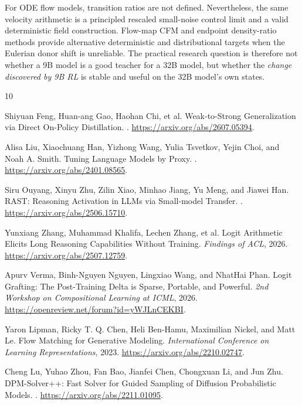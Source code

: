 \documentclass[11pt,a4paper]{article}
\theoremstyle{plain}
\theoremstyle{definition}
\begin{document}
For ODE flow models, transition ratios are not defined.  Nevertheless, the same velocity arithmetic
is a principled rescaled small-noise control limit and a valid deterministic field construction.
Flow-map CFM and endpoint density-ratio methods provide alternative deterministic and distributional
targets when the Eulerian donor shift is unreliable.  The practical research question is therefore
not whether a 9B model is a good teacher for a 32B model, but whether the \emph{change discovered by
9B RL} is stable and useful on the 32B model's own states.

\begin{thebibliography}{10}

Shiyuan Feng, Huan-ang Gao, Haohan Chi, et al.
\newblock Weak-to-Strong Generalization via Direct On-Policy Distillation.
.
\newblock \url{https://arxiv.org/abs/2607.05394}.

Alisa Liu, Xiaochuang Han, Yizhong Wang, Yulia Tsvetkov, Yejin Choi, and Noah A. Smith.
\newblock Tuning Language Models by Proxy.
.
\newblock \url{https://arxiv.org/abs/2401.08565}.

Siru Ouyang, Xinyu Zhu, Zilin Xiao, Minhao Jiang, Yu Meng, and Jiawei Han.
\newblock RAST: Reasoning Activation in LLMs via Small-model Transfer.
.
\newblock \url{https://arxiv.org/abs/2506.15710}.

Yunxiang Zhang, Muhammad Khalifa, Lechen Zhang, et al.
\newblock Logit Arithmetic Elicits Long Reasoning Capabilities Without Training.
\newblock \emph{Findings of ACL}, 2026.
\newblock \url{https://arxiv.org/abs/2507.12759}.

Apurv Verma, Binh-Nguyen Nguyen, Lingxiao Wang, and NhatHai Phan.
\newblock Logit Grafting: The Post-Training Delta is Sparse, Portable, and Powerful.
\newblock \emph{2nd Workshop on Compositional Learning at ICML}, 2026.
\newblock \url{https://openreview.net/forum?id=yWJLnCEKBI}.

Yaron Lipman, Ricky T. Q. Chen, Heli Ben-Hamu, Maximilian Nickel, and Matt Le.
\newblock Flow Matching for Generative Modeling.
\newblock \emph{International Conference on Learning Representations}, 2023.
\newblock \url{https://arxiv.org/abs/2210.02747}.

Cheng Lu, Yuhao Zhou, Fan Bao, Jianfei Chen, Chongxuan Li, and Jun Zhu.
\newblock DPM-Solver++: Fast Solver for Guided Sampling of Diffusion Probabilistic Models.
.
\newblock \url{https://arxiv.org/abs/2211.01095}.


\end{thebibliography}
\end{document}
